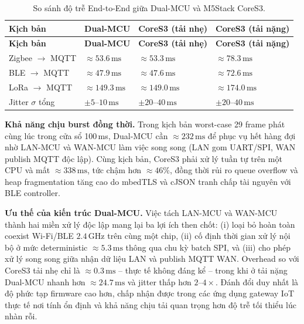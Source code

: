         \begin{longtable}{|p{4.2cm}|p{2.7cm}|p{3cm}|p{3cm}|}
            \caption{So sánh độ trễ End-to-End giữa Dual-MCU và M5Stack CoreS3.} \label{tab:e2e_compare} \\
            \hline
            \textbf{Kịch bản} & \textbf{Dual-MCU} & \textbf{CoreS3 (tải nhẹ)} & \textbf{CoreS3 (tải nặng)} \\ \hline
            \endfirsthead
            \hline
            \textbf{Kịch bản} & \textbf{Dual-MCU} & \textbf{CoreS3 (tải nhẹ)} & \textbf{CoreS3 (tải nặng)} \\ \hline
            \endhead
            \hline
            \endfoot
            \endlastfoot
            Zigbee $\rightarrow$ MQTT & $\approx 53{.}6\,\text{ms}$ & $\approx 53{.}3\,\text{ms}$ & $\approx 78{.}3\,\text{ms}$ \\ \hline
            BLE $\rightarrow$ MQTT & $\approx 47{.}9\,\text{ms}$ & $\approx 47{.}6\,\text{ms}$ & $\approx 72{.}6\,\text{ms}$ \\ \hline
            LoRa $\rightarrow$ MQTT & $\approx 149{.}3\,\text{ms}$ & $\approx 149{.}0\,\text{ms}$ & $\approx 174{.}0\,\text{ms}$ \\ \hline
            Jitter $\sigma$ tổng & $\pm 5$--$10\,\text{ms}$ & $\pm 20$--$40\,\text{ms}$ & $\pm 20$--$40\,\text{ms}$ \\ \hline
        \end{longtable}
        
        \textbf{Khả năng chịu burst đồng thời.} Trong kịch bản worst-case 29 frame phát cùng lúc trong cửa sổ 100\,ms, Dual-MCU cần $\approx 232\,\text{ms}$ để phục vụ hết hàng đợi nhờ LAN-MCU và WAN-MCU làm việc song song (LAN gom UART/SPI, WAN publish MQTT độc lập). Cùng kịch bản, CoreS3 phải xử lý tuần tự trên một CPU và mất $\approx 338\,\text{ms}$, tức chậm hơn $\approx 46\%$, đồng thời rủi ro queue overflow và heap fragmentation tăng cao do mbedTLS và cJSON tranh chấp tài nguyên với BLE controller.
        
        \textbf{Ưu thế của kiến trúc Dual-MCU.} Việc tách LAN-MCU và WAN-MCU thành hai miền xử lý độc lập mang lại ba lợi ích then chốt: (i) loại bỏ hoàn toàn coexist Wi-Fi/BLE $2{.}4\,\text{GHz}$ trên cùng một chip, (ii) cố định thời gian xử lý nội bộ ở mức deterministic $\approx 5{.}3\,\text{ms}$ thông qua chu kỳ batch SPI, và (iii) cho phép xử lý song song giữa nhận dữ liệu LAN và publish MQTT WAN. Overhead so với CoreS3 tải nhẹ chỉ là $\approx 0{.}3\,\text{ms}$ -- thực tế không đáng kể -- trong khi ở tải nặng Dual-MCU nhanh hơn $\approx 24{.}7\,\text{ms}$ và jitter thấp hơn $2$--$4\times$. Đánh đổi duy nhất là độ phức tạp firmware cao hơn, chấp nhận được trong các ứng dụng gateway IoT thực tế nơi tính ổn định và khả năng chịu tải quan trọng hơn độ trễ tối thiểu lúc nhàn rỗi.
        

